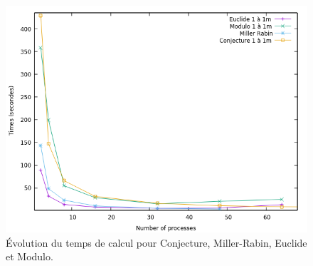 \begin{figure}[!ht]	
		\begin{center}\includegraphics[scale=0.8]{All_1M.png}\end{center}
		\caption{Évolution du temps de calcul pour Conjecture, Miller-Rabin, Euclide et Modulo. }
		\label{fg:fig1}
\end{figure}

